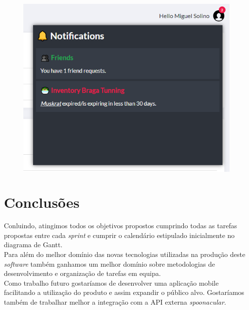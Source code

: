 \documentclass[a4paper]{report}
\begin{document}
    \begin{figure}[H]
        \centering
            \includegraphics[width=\textwidth]{images/produto_final/notificacoes.png}
    \end{figure}

\chapter{Conclusões}
    Conluindo, atingimos todos os objetivos propostos cumprindo todas as tarefas
    propostas entre cada \textit{sprint} e cumprir o calendário estipulado
    inicialmente no diagrama de Gantt.\\
    Para além do melhor domínio das novas tecnologias utilizadas na produção
    deste \textit{software} também ganhamos um melhor domínio sobre metodologias
    de desenvolvimento e organização de tarefas em equipa.\\
    Como trabalho futuro gostaríamos de desenvolver uma aplicação mobile
    facilitando a utilização do produto e assim expandir o público alvo.
    Gostaríamos também de trabalhar melhor a integração com a API externa \textit{spoonacular}.
\end{document}
